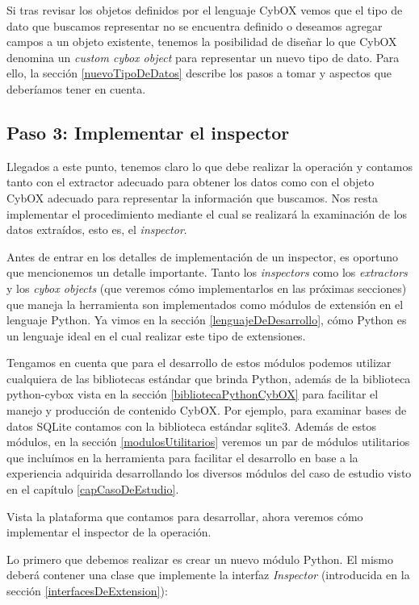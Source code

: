 Si tras revisar los objetos definidos por el lenguaje CybOX vemos que el tipo de dato que buscamos representar no se encuentra definido o deseamos agregar campos a un objeto existente, tenemos la posibilidad de diseñar lo que CybOX denomina un \emph{custom cybox object} para representar un nuevo tipo de dato. Para ello, la sección \ref{nuevoTipoDeDatos} describe los pasos a tomar y aspectos que deberíamos tener en cuenta.

\subsection*{Paso 3: Implementar el inspector}
Llegados a este punto, tenemos claro lo que debe realizar la operación y contamos tanto con el extractor adecuado para obtener los datos como con el objeto CybOX adecuado para representar la información que buscamos. Nos resta implementar el procedimiento mediante el cual se realizará la examinación de los datos extraídos, esto es, el \emph{inspector}.

Antes de entrar en los detalles de implementación de un inspector, es oportuno que mencionemos un detalle importante. Tanto los \emph{inspectors} como los \emph{extractors} y los \emph{cybox objects} (que veremos cómo implementarlos en las próximas secciones) que maneja la herramienta son implementados como módulos de extensión en el lenguaje Python. Ya vimos en la sección \ref{lenguajeDeDesarrollo}, cómo Python es un lenguaje ideal en el cual realizar este tipo de extensiones.

Tengamos en cuenta que para el desarrollo de estos módulos podemos utilizar cualquiera de las bibliotecas estándar que brinda Python, además de la biblioteca python-cybox vista en la sección \ref{bibliotecaPythonCybOX} para facilitar el manejo y producción de contenido CybOX. Por ejemplo, para examinar bases de datos SQLite contamos con la biblioteca estándar sqlite3. Además de estos módulos, en la sección \ref{modulosUtilitarios} veremos un par de módulos utilitarios que incluímos en la herramienta para facilitar el desarrollo en base a la experiencia adquirida desarrollando los diversos módulos del caso de estudio visto en el capítulo \ref{capCasoDeEstudio}.

Vista la plataforma que contamos para desarrollar, ahora veremos cómo implementar el inspector de la operación.

Lo primero que debemos realizar es crear un nuevo módulo Python. El mismo deberá contener una clase que implemente la interfaz \emph{Inspector} (introducida en la sección \ref{interfacesDeExtension}):
\newline

